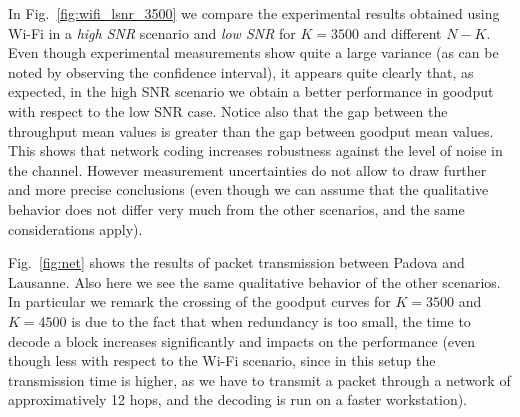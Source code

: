 In Fig.~\ref{fig:wifi_lsnr_3500} we compare the experimental results obtained using Wi-Fi in a \textit{high SNR} scenario and \textit{low SNR} for $K=3500$ and different $N-K$. Even though experimental measurements show quite a large variance (as can be noted by observing the confidence interval), it appears quite clearly that, as expected, in the high SNR scenario we obtain a better performance in goodput with respect to the low SNR case. Notice also that the gap between the throughput mean values is greater than the gap between goodput mean values. This shows that network coding increases robustness against the level of noise in the channel. However measurement uncertainties do not allow to draw further and more precise conclusions (even though we can assume that the qualitative behavior does not differ very much from the other scenarios, and the same considerations apply).

Fig.~\ref{fig:net} shows the results of packet transmission between Padova and Lausanne. Also here we see the same qualitative behavior of the other scenarios. In particular we remark the crossing of the goodput curves for $K=3500$ and $K=4500$ is due to the fact that when redundancy is too small, the time to decode a block increases significantly and impacts on the performance (even though less with respect to the Wi-Fi scenario, since in this setup the transmission time is higher, as we have to transmit a packet through a network of approximatively 12 hops, and the decoding is run on a faster workstation).

